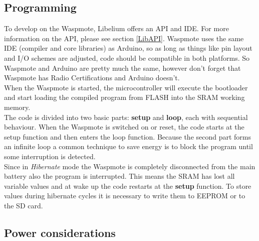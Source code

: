 \subsection{Programming}
To develop on the Waspmote, Libelium offers an API and IDE. For more information on the API, please see section \ref{LibAPI}. Waspmote uses the same IDE (compiler and core libraries) as Arduino, so as long as things like pin layout and I/O schemes are adjusted, code should be compatible in both platforms. So Waspmote and Arduino are pretty much the same, however don't forget that Waspmote has Radio Certifications and Arduino doesn't.\\  
When the Waspmote is started, the microcontroller will execute the bootloader and start loading the compiled program from FLASH into the SRAM working memory.\\
The code is divided into two basic parts: \textbf{setup} and \textbf{loop}, each with sequential behaviour. When the Waspmote is switched on or reset, the code starts at the setup function and then enters the loop function. Because the second part forms an infinite loop a common technique to save energy is to block the program until some interruption is detected.\\
Since in \textit{Hibernate} mode the Waspmote is completely disconnected from the main battery also the program is interrupted. This means the SRAM has lost all variable values and at wake up the code restarts at the \textbf{setup} function. To store values during hibernate cycles it is necessary to write them to EEPROM or to the SD card.
\subsection{Power considerations}
\label{pow}
